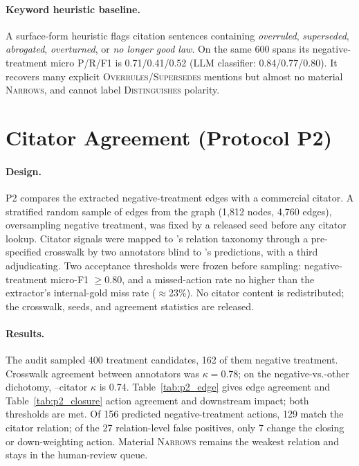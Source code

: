 \paragraph{Keyword heuristic baseline.}
A surface-form heuristic flags citation sentences containing \textit{overruled}, \textit{superseded}, \textit{abrogated}, \textit{overturned}, or \textit{no longer good law}.
On the same 600 spans its negative-treatment micro P/R/F1 is 0.71/0.41/0.52 (LLM classifier: 0.84/0.77/0.80).
It recovers many explicit \textsc{Overrules}/\textsc{Supersedes} mentions but almost no material \textsc{Narrows}, and cannot label \textsc{Distinguishes} polarity.

\section{Citator Agreement (Protocol P2)}
\label{app:p2}

\paragraph{Design.}
P2 compares the extracted negative-treatment edges with a commercial citator.
A stratified random sample of edges from the graph (1{,}812 nodes, 4{,}760 edges), oversampling negative treatment, was fixed by a released seed before any citator lookup.
Citator signals were mapped to \sysname{}'s relation taxonomy through a pre-specified crosswalk by two annotators blind to \sysname{}'s predictions, with a third adjudicating.
Two acceptance thresholds were frozen before sampling: negative-treatment micro-F1 $\ge 0.80$, and a missed-action rate no higher than the extractor's internal-gold miss rate ($\approx$23\%).
No citator content is redistributed; the crosswalk, seeds, and agreement statistics are released.

\paragraph{Results.}
The audit sampled 400 treatment candidates, 162 of them negative treatment.
Crosswalk agreement between annotators was $\kappa = 0.78$; on the negative-vs.-other dichotomy, \sysname{}--citator $\kappa$ is 0.74.
Table~\ref{tab:p2_edge} gives edge agreement and Table~\ref{tab:p2_closure} action agreement and downstream impact; both thresholds are met.
Of 156 predicted negative-treatment actions, 129 match the citator relation; of the 27 relation-level false positives, only 7 change the closing or down-weighting action.
Material \textsc{Narrows} remains the weakest relation and stays in the human-review queue.

